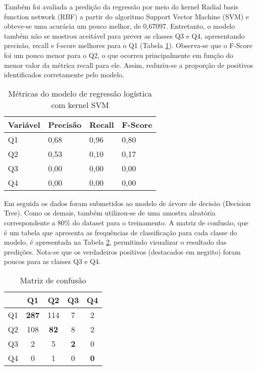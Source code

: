 \documentclass[runningheads]{llncs}
\begin{document}
Também foi avaliada a predição da regressão por meio do kernel Radial basis function network (RBF) a partir do algoritmo Support Vector Machine (SVM) e obteve-se uma acurácia um pouco melhor, de 0,67097. Entretanto, o modelo também não se mostrou aceitável para prever as classes Q3 e Q4, apresentando precisão, recall e f-score melhores para o Q1 (Tabela \ref{tabmsvm}). Observa-se que o F-Score foi um pouco menor para o Q2, o que ocorreu principalmente em função do menor valor da métrica recall para ele. Assim, reduziu-se a proporção de positivos identificados corretamente pelo modelo.

\begin{table}[]
    \centering
    \caption{Métricas do modelo de regressão logística com kernel SVM}
    \label{tabmsvm}
    \begin{tabular}{|l|l|l|l|}
         \hline
         Variável & Precisão & Recall & F-Score\\
         \hline
         Q1 & 0,68 & 0,96 & 0,80\\
         Q2 & 0,53 & 0,10 & 0,17\\
         Q3 & 0,00 & 0,00 & 0,00\\
         Q4 & 0,00 & 0,00 & 0,00\\
         \hline
    \end{tabular}
\end{table}

Em seguida os dados foram submetidos ao modelo de árvore de decisão (Decision Tree). Como os demais, também utilizou-se de uma amostra aleatória correspondente a 80\% do dataset para o treinamento. A matriz de confusão, que é um tabela que apresenta as frequências de classificação para cada classe do modelo, é apresentada na Tabela \ref{tabmc}, permitindo visualizar o resultado das predições. Nota-se que os verdadeiros positivos (destacados em negrito) foram poucos para as classes Q3 e Q4.

\begin{table}[]
    \centering
    \caption{Matriz de confusão}
    \label{tabmc}
    \begin{tabular}{|c|c|c|c|c|}
         \hline
         & Q1 & Q2 & Q3 & Q4\\
         \hline
         Q1 & \textbf{287} & 114 & 7 & 2\\
         \hline
         Q2 & 108 & \textbf{82} & 8 & 2\\
         \hline
         Q3 & 2 & 5 & \textbf{2} & 0\\
         \hline
         Q4 & 0 & 1 & 0 & \textbf{0}\\
         \hline
    \end{tabular}
\end{table}
\end{document}
